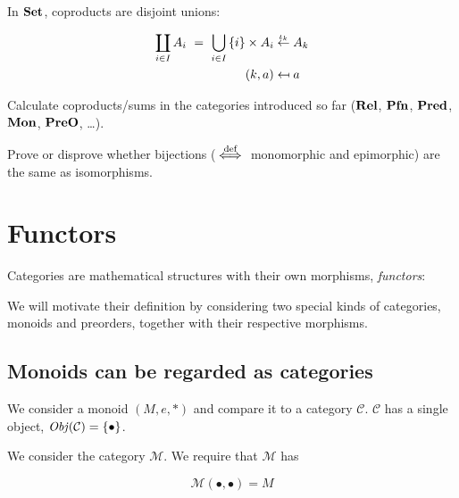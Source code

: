 In $\mathbf {Set}$, coproducts are disjoint unions:

\begin{equation*}
    \begin{aligned}
        \coprod_{i \in I} A_i \ = \ \bigcup_{i \in I}\, \setof{i} \times A_i &
        \overset{\iota_k}{\leftarrow} A_k
        \\
        (k, a) &
        \mapsfrom a
    \end{aligned}
\end{equation*}

\begin{exercise}
Calculate coproducts/sums in the categories introduced so far ($\mathbf {Rel}$,
$\mathbf {Pfn}$, $\mathbf {Pred}$, $\mathbf {Mon}$, $\mathbf {PreO}$, \dots).
\end{exercise}

\begin{exercise}
Prove or disprove whether bijections ($\stackrel{\text{def}}{\iff}$ monomorphic and epimorphic) are
the same as isomorphisms.
\end{exercise}

\section{Functors}

Categories are mathematical structures with their own morphisms,
\emph{functors}:
\begin{center}
\end{center}
We will motivate their definition by considering two special kinds of
categories, monoids and preorders, together with their respective morphisms.

\subsection{Monoids can be regarded as categories}

We consider a monoid $(M, e, \ast)$ and compare it to a category $\mathcal C$.
$\mathcal C$ has a single object, $\operatorname{\mathit{Obj}}(\mathcal C) = \{ \bullet \}$.

We consider the category $\mathcal M$. We require that $\mathcal M$ has

\begin{equation*}
\mathcal{M}(\bullet, \bullet) = M
\end{equation*}

